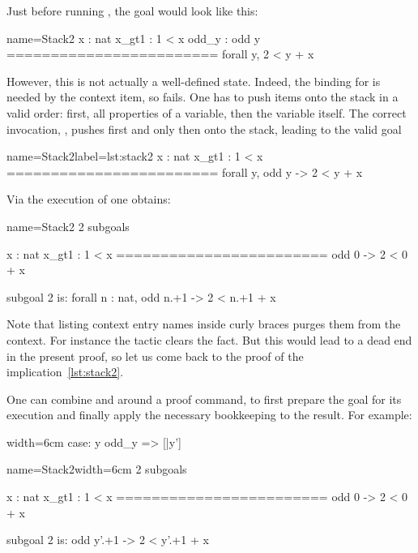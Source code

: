 Just before running , the goal would look like this:

\begin{coqout}{name=Stack2}{}
 x : nat
 x_gt1 : 1 < x
 odd_y : odd y
 ========================
 forall y, 2 < y + x
\end{coqout}

However, this is not actually a well-defined state.
Indeed, the binding for  is needed by the 
context item, so  fails.  One has to push items onto the
stack in a valid order: first, all properties of a variable, then the
variable itself.  The correct invocation,
, pushes first  and only then  onto
the stack, leading to the valid goal

\begin{coqout}{name=Stack2}{label=lst:stack2}
 x : nat
 x_gt1 : 1 < x
 ========================
 forall y, odd y -> 2 < y + x
\end{coqout}

Via the execution of  one obtains:

\begin{coqout}{name=Stack2}{}
2 subgoals

  x : nat
  x_gt1 : 1 < x
  ========================
   odd 0 -> 2 < 0 + x

subgoal 2 is:
 forall n : nat, odd n.+1 -> 2 < n.+1 + x
\end{coqout}

Note that listing context entry names inside curly braces purges them
from the context. For instance the tactic 
clears the  fact. But this would lead to a dead end in the
present proof, so let us come back to the proof of the
implication~\ref{lst:stack2}.


One can combine \C{:} and \C{=>} around a proof command, to first prepare the
goal for its execution and finally apply the necessary bookkeeping to the
result.  For example:

\begin{coq}{}{width=6cm}
case: y odd_y => [|y']
\end{coq}
\begin{coqout}{name=Stack2}{width=6cm}
2 subgoals

  x : nat
  x_gt1 : 1 < x
  ========================
   odd 0 -> 2 < 0 + x

subgoal 2 is:
 odd y'.+1 -> 2 < y'.+1 + x
\end{coqout}

